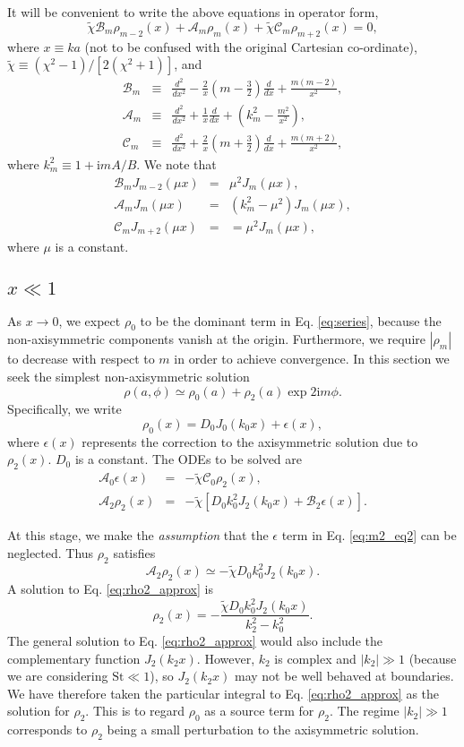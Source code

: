 \documentclass[useAMS,8pt,twocolumn]{article}
\newcommand{\beq}{\begin{equation}}
\newcommand{\eeq}{\end{equation}}
\newcommand{\beqn}{\begin{eqnarray}}
\newcommand{\eeqn}{\end{eqnarray}}
\begin{document}
It will be convenient to write the above equations
in operator form,
\beq\label{eq:ode2}
\tilde{\chi}\mathcal{B}_m\rho_{m-2}(x) + \mathcal{A}_m\rho_m(x) + \tilde{\chi}\mathcal{C}_m\rho_{m+2}(x)=0,
\eeq
where $x\equiv ka$ (not to be confused with the original Cartesian
co-ordinate), $\tilde{\chi}\equiv(\chi^2-1)/[2(\chi^2+1)]$, and 
\beqn\label{eq:ops}
\mathcal{B}_m &\equiv& \frac{d^2}{dx^2} -
\frac{2}{x}\left(m-\frac{3}{2}\right)\frac{d}{dx} + \frac{m(m-2)}{x^2},\\
\mathcal{A}_m &\equiv& \frac{d^2}{dx^2} + \frac{1}{x}\frac{d}{dx} +
\left(k_m^2 - \frac{m^2}{x^2}\right),\\
\mathcal{C}_m  &\equiv& \frac{d^2}{dx^2} +
\frac{2}{x}\left(m+\frac{3}{2}\right)\frac{d}{dx} +
\frac{m(m+2)}{x^2}, 
\eeqn
where $k_m^2 \equiv 1+\mathrm{i}mA/B$. We note that
\beqn\label{eq:ops2}
\mathcal{B}_mJ_{m-2}(\mu x) &=& \mu^2J_m(\mu x),\\
\mathcal{A}_mJ_m(\mu x) &=& \left(k_m^2 - \mu^2\right)J_m(\mu x),\\
\mathcal{C}_mJ_{m+2}(\mu x) &= & = \mu^2J_m(\mu x),
\eeqn
where $\mu$ is a constant. 

\subsection{$x\ll 1$}
As $x\to0$, we expect $\rho_0$ to be the dominant term in
Eq. \ref{eq:series}, because the non-axisymmetric components vanish
at the origin. Furthermore, we require $|\rho_m|$ to decrease with
respect to $m$ in order to achieve convergence. In this section we
seek the simplest non-axisymmetric solution
\beq
\rho(a,\phi) \simeq \rho_0(a) + \rho_2(a)\exp{2\mathrm{i}m\phi}. 
\eeq
Specifically, we write
\beq
\rho_0(x) = D_0J_0(k_0x) + \epsilon(x),  
\eeq
where $\epsilon(x)$ represents the correction to the axisymmetric
solution due to $\rho_2(x)$. $D_0$ is a constant. The ODEs to be
solved are 
\beqn
\mathcal{A}_0\epsilon(x) &=& -\tilde{\chi}\mathcal{C}_0\rho_2(x),\label{eq:m2_eq1}\\
\mathcal{A}_2\rho_2(x) &=& -\tilde{\chi}\left[D_0k_0^2J_2(k_0x) +
  \mathcal{B}_2\epsilon(x)\right].\label{eq:m2_eq2} 
\eeqn

At this stage, we make the \emph{assumption} that the $\epsilon$ term
in Eq. \ref{eq:m2_eq2} can be neglected. Thus $\rho_2$ satisfies
\beq\label{eq:rho2_approx}
\mathcal{A}_2\rho_2(x) \simeq -\tilde{\chi}D_0k_0^2J_2(k_0x).
\eeq
A solution to Eq. \ref{eq:rho2_approx} is
\beq\label{eq:rho2_approx_sol}
\rho_2(x)  = -\frac{\tilde{\chi}D_0k_0^2J_2(k_0x)}{k_2^2 - k_0^2}. 
\eeq
The general solution to Eq. \ref{eq:rho2_approx} would also include the
complementary function $J_2(k_2x)$. However, $k_2$ is complex and $|k_2|\gg 1$ (because we are considering
$\mathrm{St}\ll1$), so $J_2(k_2x)$
may not be well behaved at boundaries. We have therefore taken the
particular integral to Eq. \ref{eq:rho2_approx} as the solution for
$\rho_2$. This is to regard $\rho_0$ as a source term for
$\rho_2$. The regime $|k_2|\gg1$ corresponds to  
$\rho_2$ being a small perturbation to the
axisymmetric solution. 
\end{document}
